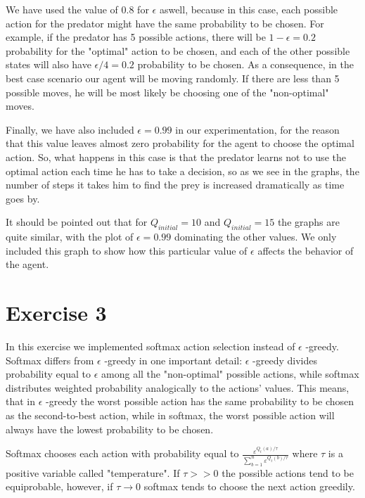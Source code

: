 \documentclass[a4paper,11pt]{article}
\begin{document}
We have used the value of 0.8 for $\epsilon$ aswell, because in this case, each possible action for the predator might have the same probability to be chosen. For example, if the predator has 5 possible actions, there will be $1-\epsilon = 0.2$ probability for the "optimal" action to be chosen, and each of the other possible states will also have $\epsilon /4 = 0.2$ probability to be chosen. As a consequence, in the best case scenario our agent will be moving randomly. If there are less than 5 possible moves, he will be most likely be choosing one of the "non-optimal" moves.


Finally, we have also included $\epsilon = 0.99$ in our experimentation, for the reason that this value leaves almost zero probability for the agent to choose the optimal action. So, what happens in this case is that the predator learns not to use the optimal action each time he has to take a decision, so as we see in the graphs, the number of steps it takes him to find the prey is increased dramatically as time goes by.


It should be pointed out that for $Q_{initial} = 10$ and $Q_{initial} = 15$ the graphs are quite similar, with the plot of $\epsilon = 0.99$ dominating the other values. We only included this graph to show how this particular value of $\epsilon$ affects the behavior of the agent.





\section*{Exercise 3}

In this exercise we implemented softmax action selection instead of $\epsilon$ -greedy. 
Softmax differs from $\epsilon$ -greedy in one important detail: $\epsilon$ -greedy divides probability equal to $\epsilon$ among all the "non-optimal" possible actions, while softmax distributes weighted probability analogically to the actions' values. This means, that in $\epsilon$ -greedy the worst possible action has the same probability to be chosen as the second-to-best action, while in softmax, the worst possible action will always have the lowest probability to be chosen.

Softmax chooses each action with probability equal to $\frac{\varepsilon ^{Q_t(a)/ \tau}}{\sum^n_{b=1}\varepsilon ^{Q_t(b)/ \tau}}$
where $\tau$ is a positive variable called "temperature". If $\tau >> 0$ the possible actions tend to be equiprobable, however, if $\tau \rightarrow 0$ softmax tends to choose the next action greedily.
\end{document}
